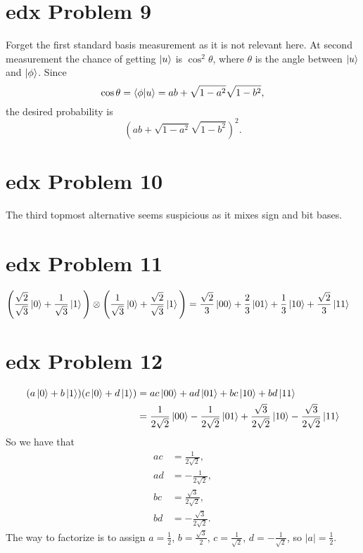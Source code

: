\documentclass[10pt]{article}
\begin{document}
\section*{edx Problem 9}
Forget the first standard basis measurement as it is not relevant here. At second measurement the chance of getting $\ket{u}$ is $\cos^2 \theta$, where $\theta$ is the angle between $\ket{u}$ and $\ket{\phi}$. Since
\[
\cos \theta = \braket{\phi | u} = ab + \sqrt{1 - a^2} \sqrt{1 - b^2},
\]
the desired probability is 
\[
(ab + \sqrt{1 - a^2} \sqrt{1 - b^2})^2.
\]

\section*{edx Problem 10}
The third topmost alternative seems suspicious as it mixes sign and bit bases.

\section*{edx Problem 11}
\begin{align*}
\Bigg( \frac{\sqrt{2}}{\sqrt{3}} \ket{0} + \frac{1}{\sqrt{3}} \ket{1} \Bigg) \otimes \Bigg( \frac{1}{\sqrt{3}} \ket{0} + \frac{\sqrt{2}}{\sqrt{3}} \ket{1} \Bigg) &= \frac{\sqrt{2}}{3} \ket{00} + \frac{2}{3} \ket{01} + \frac{1}{3} \ket{10} + \frac{\sqrt{2}}{3} \ket{11} 
\end{align*}

\section*{edx Problem 12}
\begin{align*}
(a \ket{0} + b \ket{1})(c \ket{0} + d \ket{1}) &= ac \ket{00} + ad \ket{01} + bc \ket{10} + bd \ket{11} \\
																	 &= \frac{1}{2\sqrt{2}} \ket{00} - \frac{1}{2\sqrt{2}} \ket{01} + \frac{\sqrt{3}}{2\sqrt{2}} \ket{10} - \frac{\sqrt{3}}{2\sqrt{2}} \ket{11} 
\end{align*}
So we have that 
\begin{align*}
ac &= \frac{1}{2\sqrt{2}}, \\
ad &= -\frac{1}{2\sqrt{2}}, \\
bc &= \frac{\sqrt{3}}{2\sqrt{2}}, \\
bd &= -\frac{\sqrt{3}}{2\sqrt{2}}.
\end{align*}
The way to factorize is to assign $a = \frac{1}{2}$, $b = \frac{\sqrt{3}}{2}$, $c = \frac{1}{\sqrt{2}}$, $d = -\frac{1}{\sqrt{2}}$, so $|a| = \frac{1}{2}$.
\end{document}
